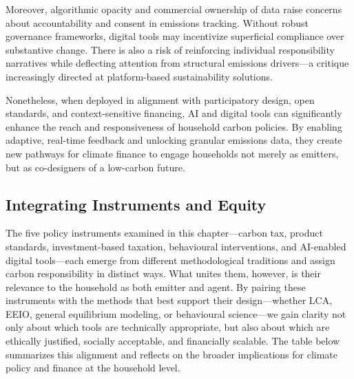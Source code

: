 \documentclass[12pt,a4paper]{article}%
\begin{document}
Moreover, algorithmic opacity and commercial ownership of data raise concerns about accountability and consent in emissions tracking. Without robust governance frameworks, digital tools may incentivize superficial compliance over substantive change. There is also a risk of reinforcing individual responsibility narratives while deflecting attention from structural emissions drivers—a critique increasingly directed at platform-based sustainability solutions.

Nonetheless, when deployed in alignment with participatory design, open standards, and context-sensitive financing, AI and digital tools can significantly enhance the reach and responsiveness of household carbon policies. By enabling adaptive, real-time feedback and unlocking granular emissions data, they create new pathways for climate finance to engage households not merely as emitters, but as co-designers of a low-carbon future.

\subsection{Integrating Instruments and Equity}

The five policy instruments examined in this chapter—carbon tax, product standards, investment-based taxation, behavioural interventions, and AI-enabled digital tools—each emerge from different methodological traditions and assign carbon responsibility in distinct ways. What unites them, however, is their relevance to the household as both emitter and agent. By pairing these instruments with the methods that best support their design—whether LCA, EEIO, general equilibrium modeling, or behavioural science—we gain clarity not only about which tools are technically appropriate, but also about which are ethically justified, socially acceptable, and financially scalable. The table below summarizes this alignment and reflects on the broader implications for climate policy and finance at the household level.
\end{document}
